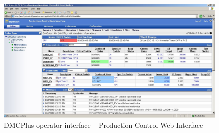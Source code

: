 \begin{landscape}
  \begin{figure}[htbp]
    \centering
      \includegraphics[width=25cm]{graph/ss_dmcpluswebinterface.jpg}
    \caption[DMCPlus Production Control Web Interface]{DMCPlus operator interface -- Production Control Web Interface}
    \label{fig:ssdmcplusoperator}
  \end{figure}

\end{landscape}

